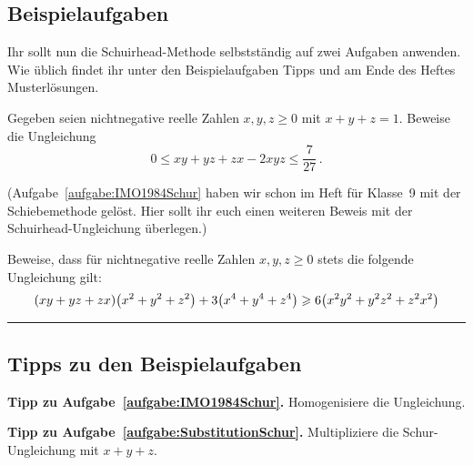 \subsection*{Beispielaufgaben}
Ihr sollt nun die Schuirhead-Methode selbstständig auf zwei Aufgaben anwenden. Wie üblich findet ihr unter den Beispielaufgaben Tipps und am Ende des Heftes Musterlösungen.
\begin{aufgabe*}\label{aufgabe:IMO1984Schur}
	Gegeben seien nichtnegative reelle Zahlen $x,y,z\geqslant 0$ mit $x+y+z=1$. Beweise die Ungleichung
	\begin{equation*}
		0\leqslant xy+yz+zx-2xyz\leqslant\frac{7}{27}\,.
	\end{equation*}
\end{aufgabe*}
(Aufgabe~\ref{aufgabe:IMO1984Schur} haben wir schon im Heft für Klasse~9 mit der Schiebemethode gelöst. Hier sollt ihr euch einen weiteren Beweis mit der Schuirhead-Ungleichung überlegen.)
\begin{aufgabe*}\label{aufgabe:SubstitutionSchur}
	Beweise, dass für nichtnegative reelle Zahlen $x,y,z\geqslant 0$ stets die folgende Ungleichung gilt:
	\begin{equation*}
		(xy+yz+zx)\parens*{x^2+y^2+z^2}+3\parens*{x^4+y^4+z^4}\geqslant 6\parens*{x^2y^2+y^2z^2+z^2x^2}
	\end{equation*}
\end{aufgabe*}

\phantom{newpage}\vfill\hrule\vspace{-1em}

\subsection*{Tipps zu den Beispielaufgaben}
\textbf{Tipp zu Aufgabe~\ref{aufgabe:IMO1984Schur}.} Homogenisiere die Ungleichung.

\textbf{Tipp zu Aufgabe~\ref{aufgabe:SubstitutionSchur}.} Multipliziere die Schur-Ungleichung mit $x+y+z$.